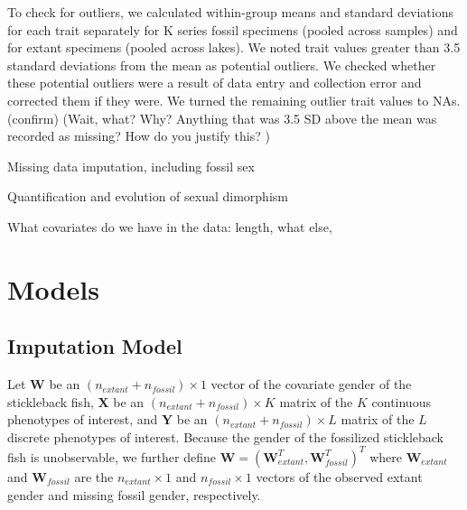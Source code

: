 \documentclass[
  12pt,
]{article}
\begin{document}
To check for outliers, we calculated within-group means and standard
deviations for each trait separately for K series fossil specimens
(pooled across samples) and for extant specimens (pooled across lakes).
We noted trait values greater than 3.5 standard deviations from the mean
as potential outliers. We checked whether these potential outliers were
a result of data entry and collection error and corrected them if they
were. We turned the remaining outlier trait values to NAs. (confirm)
(Wait, what? Why? Anything that was 3.5 SD above the mean was recorded
as missing? How do you justify this? )

Missing data imputation, including fossil sex

Quantification and evolution of sexual dimorphism

What covariates do we have in the data: length, what else,

\hypertarget{sec:models}{%
\section{Models}\label{sec:models}}

\hypertarget{imputation-model}{%
\subsection{Imputation Model}\label{imputation-model}}

Let \(\boldsymbol{W}\) be an \((n_{extant} + n_{fossil}) \times 1\)
vector of the covariate gender of the stickleback fish,
\(\boldsymbol{X}\) be an \((n_{extant} + n_{fossil}) \times K\) matrix
of the \(K\) continuous phenotypes of interest, and \(\boldsymbol{Y}\)
be an \((n_{extant} + n_{fossil}) \times L\) matrix of the \(L\)
discrete phenotypes of interest. Because the gender of the fossilized
stickleback fish is unobservable, we further define
\(\boldsymbol{W} = (\boldsymbol{W}_{extant}^T,\boldsymbol{W}_{fossil}^T)^T\)
where \(\boldsymbol{W}_{extant}\) and \(\boldsymbol{W}_{fossil}\) are
the \(n_{extant} \times 1\) and \(n_{fossil} \times 1\) vectors of the
observed extant gender and missing fossil gender, respectively.
\end{document}
